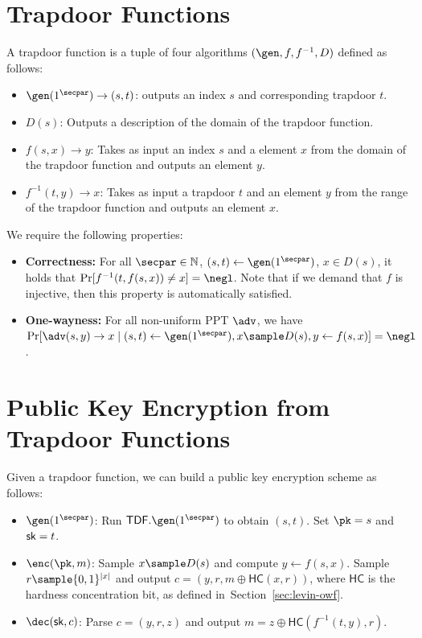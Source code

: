 \section{Trapdoor Functions}
\begin{definition}
    A trapdoor function is a tuple of four algorithms $(\gen, f, f^{-1}, D)$ defined as follows:
    \begin{itemize}
        \item $\gen(1^\secpar) \to (s,t)$: outputs an index $s$ and corresponding trapdoor $t$.
        \item $D(s)$: Outputs a description of the domain of the trapdoor function.
        \item $f(s, x) \to y$: Takes as input an index $s$ and a element $x$ from the domain of the trapdoor function and outputs an element $y$.
        \item $f^{-1}(t, y) \to x$: Takes as input a trapdoor $t$ and an element $y$ from the range of the trapdoor function and outputs an element $x$.
    \end{itemize}
    We require the following properties:
    \begin{itemize}
        \item \textbf{Correctness:} For all $\secpar \in \mathbb{N}$, $(s,t) \gets \gen(1^\secpar)$, $x \in D(s)$, it holds that $\Pr[f^{-1}(t, f(s, x)) \neq x] = \negl$. Note that if we demand that $f$ is injective, then this property is automatically satisfied.
        \item \textbf{One-wayness:} For all non-uniform PPT $\adv$, we have $\Pr[\adv(s, y) \to x \mid (s,t) \gets \gen(1^\secpar), x \sample D(s), y \gets f(s, x)] = \negl$.
    \end{itemize}
\end{definition}

\section{Public Key Encryption from Trapdoor Functions}
Given a trapdoor function, we can build a public key encryption scheme as follows:
\begin{itemize}
    \item $\gen(1^\secpar)$: Run $\mathsf{TDF}.\gen(1^\secpar)$ to obtain $(s,t)$. Set $\pk = s$ and $\mathsf{sk} = t$.
    \item $\enc(\pk, m)$: Sample $x \sample D(s)$ and compute $y \gets f(s, x)$. Sample $r \sample \{0,1\}^{|x|}$ and output $c = (y, r, m \oplus \mathsf{HC}(x,r))$, where $\mathsf{HC}$ is the hardness concentration bit, as defined in~Section~\ref{sec:levin-owf}.
    \item $\dec(\sk, c)$: Parse $c = (y, r, z)$ and output $m = z \oplus \mathsf{HC}(f^{-1}(t, y), r)$.
\end{itemize}

